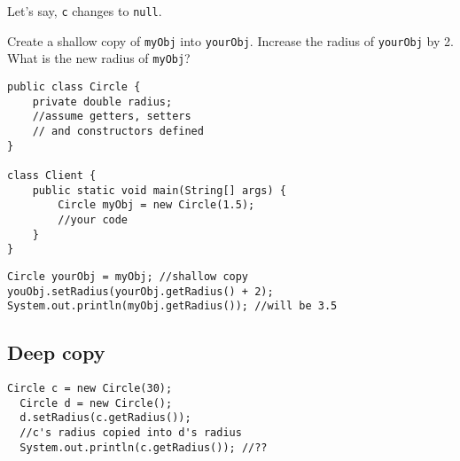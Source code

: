 Let's say, \texttt{c} changes to \texttt{null}.

\begin{center}
\end{center}
  
\begin{exercise}
Create a shallow copy of \texttt{myObj} into \texttt{yourObj}. Increase the radius of \texttt{yourObj} by 2. What is the new radius of \texttt{myObj}?

\begin{lstlisting}[frame=single,style=buggy,backgroundcolor = \color{green!10!white}]
public class Circle {
	private double radius;
	//assume getters, setters 
	// and constructors defined
}

class Client {
	public static void main(String[] args) {
		Circle myObj = new Circle(1.5);
		//your code
	}
}
\end{lstlisting}  	
\end{exercise}
\begin{answer} \begin{lstlisting}
Circle yourObj = myObj; //shallow copy
youObj.setRadius(yourObj.getRadius() + 2);
System.out.println(myObj.getRadius()); //will be 3.5
\end{lstlisting} \end{answer}


\subsection{Deep copy}
  \begin{lstlisting}[style=correct,basicstyle=\footnotesize]
  Circle c = new Circle(30);
  Circle d = new Circle();
  d.setRadius(c.getRadius());
  //c's radius copied into d's radius
  System.out.println(c.getRadius()); //??
  \end{lstlisting}    
  
